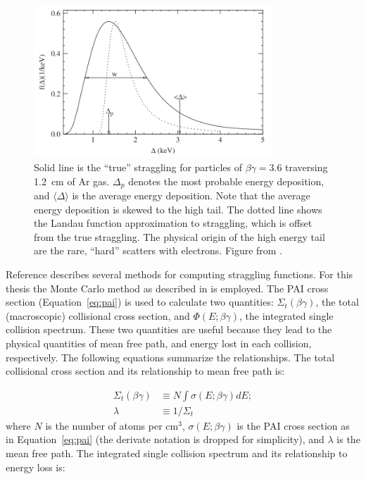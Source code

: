 \begin{figure}[htbp]
\begin{center}
\includegraphics[width=0.8\textwidth]{figures/lips/straggling.png}
\caption{Solid line is the ``true'' straggling for particles of $\beta \gamma = 3.6$ traversing 1.2~cm of Ar gas. $\Delta_{p}$ denotes the most probable energy deposition, and $\langle \Delta \rangle$ is the average energy deposition. Note that the average energy deposition is skewed to the high tail. The dotted line shows the Landau function approximation to straggling, which is offset from the true straggling. The physical origin of the high energy tail are the rare, ``hard'' scatters with electrons. Figure from \cite{Bichsel:2006}. }
\label{fig:straggling}
\end{center}
\end{figure}

Reference \cite{Bichsel:2006} describes several methods for computing straggling functions. For this thesis the Monte Carlo method as described in \cite{Bichsel:2006} is employed. The \ac{PAI} cross section (Equation~\ref{eq:pai}) is used to calculate two quantities: $\Sigma_{t}(\beta \gamma)$, the total (macroscopic) collisional cross section, and $\Phi(E; \beta \gamma)$, the integrated single collision spectrum. These two quantities are useful because they lead to the physical quantities of mean free path, and energy lost in each collision, respectively. The following equations summarize the relationships. The total collisional cross section and its relationship to mean free path is:

\begin{equation}
\begin{split}
\Sigma_{t}(\beta \gamma) &\equiv N \int \sigma(E; \beta \gamma) dE ;\\
\lambda &\equiv 1 / \Sigma_{t}
\end{split}
\end{equation}
where $N$ is the number of atoms per cm$^{3}$, $\sigma(E; \beta \gamma)$ is the \ac{PAI} cross section as in Equation~\ref{eq:pai} (the derivate notation is dropped for simplicity), and $\lambda$ is the mean free path. The integrated single collision spectrum and its relationship to energy loss is:

